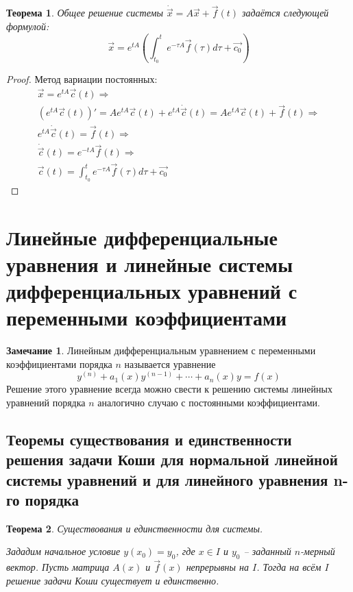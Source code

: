 \documentclass[a4paper,12pt]{article}
\theoremstyle{plain}
\newtheorem{theorem}{Теорема}[section]
\theoremstyle{definition}
\newtheorem*{note}{Замечание}
\theoremstyle{remark}
\begin{document}
\begin{theorem}
	Общее решение системы $\dot{\vec{x}} = A\vec{x} + \vec{f}(t)$ задаётся следующей формулой:
	\[\vec{x} = e^{tA}\left(\int_{t_0}^te^{-\tau A}\vec{f}(\tau)d\tau + \vec{c_0}\right)\]
\end{theorem}
\begin{proof}
	Метод вариации постоянных:
	\begin{align*}
		\vec{x} = e^{tA}\vec{c}(t) \Rightarrow                                                                        \\
		(e^{tA}\vec{c}(t))' = Ae^{tA}\vec{c}(t) + e^{tA}\dot{\vec{c}}(t) = Ae^{tA}\vec{c}(t) + \vec{f}(t) \Rightarrow \\
		e^{tA}\dot{\vec{c}}(t) = \vec{f}(t) \Rightarrow                                                               \\
		\dot{\vec{c}}(t) = e^{-tA}\vec{f}(t) \Rightarrow                                                              \\
		\vec{c}(t) = \int_{t_0}^t e^{-\tau A}\vec{f}(\tau)d\tau + \vec{c_0}
	\end{align*}
\end{proof}

\section{Линейные дифференциальные уравнения и линейные системы дифференциальных уравнений с переменными коэффициентами}
\begin{note}
	Линейным дифференциальным уравнением с переменными коэффициентами порядка $n$ называется уравнение
	\[y^{(n)} + a_1(x)y^{(n-1)}+\cdots + a_n(x)y = f(x)\]
	Решение этого уравнение всегда можно свести к решению системы линейных уравнений порядка $n$ аналогично случаю с постоянными коэффициентами.
\end{note}

\subsection{Теоремы существования и единственности решения задачи Коши для нормальной линейной системы уравнений и для линейного уравнения n-го порядка}
\begin{theorem}
	Существования и единственности для системы.

	Зададим начальное условие $y(x_0) = y_0$, где $x \in I$ и $y_0$ -- заданный $n$-мерный вектор. Пусть матрица $A(x)$ и $\vec{f}(x)$ непрерывны на $I$. Тогда на всём $I$ решение задачи Коши существует и единственно.
\end{theorem}
\end{document}
